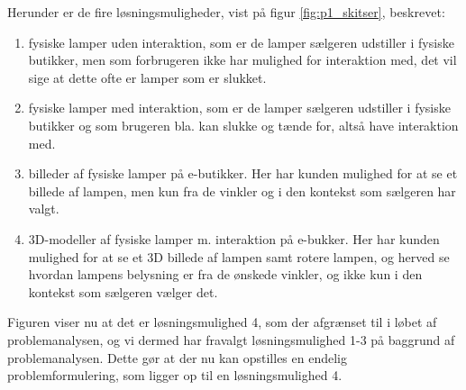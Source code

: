 Herunder er de fire løsningsmuligheder, vist på figur \ref{fig:p1_skitser}, beskrevet:
\begin{enumerate}
  \item fysiske lamper uden interaktion, som er de lamper sælgeren udstiller i fysiske butikker, men som forbrugeren ikke har mulighed for interaktion med, det vil sige at dette ofte er lamper som er slukket.

  \item fysiske lamper med interaktion, som er de lamper sælgeren udstiller i fysiske butikker og som brugeren bla. kan slukke og tænde for, altså have interaktion med.

  \item billeder af fysiske lamper på e-butikker. Her har kunden mulighed for at se et billede af lampen, men kun fra de vinkler og i den kontekst som sælgeren har valgt.

  \item 3D-modeller af fysiske lamper m. interaktion på e-bukker. Her har kunden mulighed for at se et 3D billede af lampen samt rotere lampen, og herved se hvordan lampens belysning er fra de ønskede vinkler, og ikke kun i den kontekst som sælgeren vælger det. 
\end{enumerate}

Figuren viser nu at det er løsningsmulighed 4, som der afgrænset til i løbet af problemanalysen, og vi dermed har fravalgt løsningsmulighed 1-3 på baggrund af problemanalysen. Dette gør at der nu kan opstilles en endelig problemformulering, som ligger op til en løsningsmulighed 4.